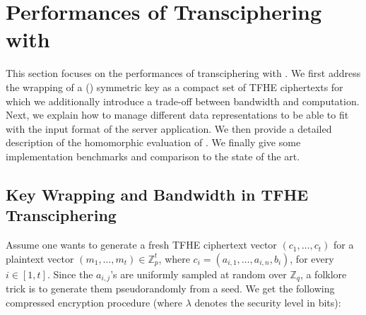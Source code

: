 


\section{Performances of Transciphering with \coolName}
\label{sec:bench}


This section focuses on the performances of transciphering with \coolName. We first address the wrapping of a (\coolName) symmetric key as a compact set of TFHE ciphertexts for which we additionally introduce a trade-off between bandwidth and computation. Next, we explain how to manage different data representations to be able to fit with the input format of the server application. We then provide a detailed description of the homomorphic evaluation of \coolName. We finally give some implementation benchmarks and comparison to the state of the art.

\subsection{Key Wrapping and Bandwidth in TFHE Transciphering} \label{sec:key_wrapping}

Assume one wants to generate a fresh TFHE ciphertext vector $(c_1, \ldots, c_t)$ for a plaintext vector $(m_1, \ldots, m_t) \in \mathbb{Z}_p^t$, where $c_i = (a_{i,1}, \ldots, a_{i,n}, b_i)$, for every $i \in [1,t]$. Since the $a_{i,j}$'s are uniformly sampled at random over $\mathbb{Z}_q$, a folklore trick is to generate them pseudorandomly from a seed. We get the following compressed encryption procedure (where $\lambda$ denotes the security level in bits):
  
\begin{center}
\noindent{}
\end{center}

